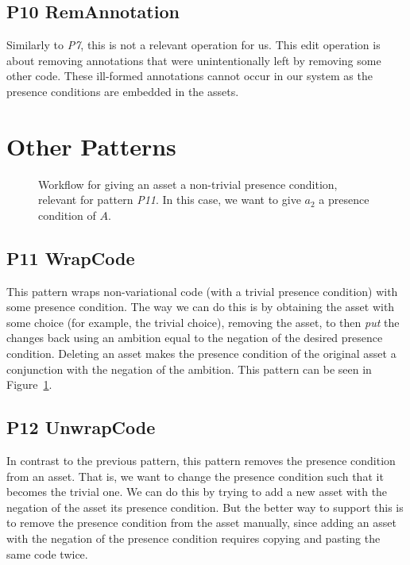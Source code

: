 \subsection*{P10 RemAnnotation}
Similarly to \emph{P7}, this is not a relevant operation for us. This edit
operation is about removing annotations that were unintentionally left by
removing some other code. These ill-formed annotations cannot occur in our
system as the presence conditions are embedded in the assets.

\section{Other Patterns}
\begin{figure}
  \centering
  \caption{Workflow for giving an asset a non-trivial presence condition, relevant for pattern \emph{P11}. In this case, we want to give $a_2$ a presence condition of $A$.}
  \label{fig:patterns:p11}
\end{figure}
\subsection*{P11 WrapCode}
This pattern wraps non-variational code (with a trivial presence condition)
with some presence condition. The way we can do this is by obtaining the asset
with some choice (for example, the trivial choice), removing the asset, to then
\emph{put} the changes back using an ambition equal to the negation of the
desired presence condition. Deleting an asset makes the presence condition of
the original asset a conjunction with the negation of the ambition. This pattern
can be seen in Figure~\ref{fig:patterns:p11}.

\subsection*{P12 UnwrapCode}
In contrast to the previous pattern, this pattern removes the presence condition
from an asset. That is, we want to change the presence condition such that it
becomes the trivial one. We can do this by trying to add a new asset with the
negation of the asset its presence condition. But the better way to support
this is to remove the presence condition from the asset manually, since
adding an asset with the negation of the presence condition requires copying
and pasting the same code twice.

